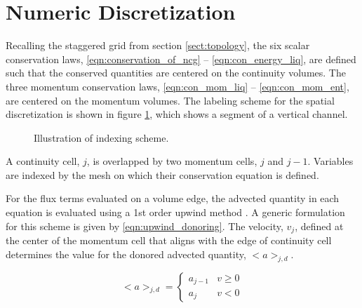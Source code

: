 \section{Numeric Discretization}
\label{sect:numeric_methods}
Recalling the staggered grid from section \ref{sect:topology}, the six scalar conservation laws, \eqref{eqn:conservation_of_ncg} -- \eqref{eqn:con_energy_liq}, are defined such that the conserved quantities are centered on the continuity volumes.
The three momentum conservation laws, \eqref{eqn:con_mom_liq} -- \eqref{eqn:con_mom_ent}, are centered on the momentum volumes.
The labeling scheme for the spatial discretization is shown in figure \ref{fig:vertical_pipe_with_cells}, which shows a segment of a vertical channel.

\begin{figure}[ht]
\caption{Illustration of indexing scheme.}
\label{fig:vertical_pipe_with_cells}
\begin{center}
\end{center}
\end{figure}

A continuity cell, $j$, is overlapped by two momentum cells, $j$ and $j-1$.
Variables are indexed by the mesh on which their conservation equation is defined.

For the flux terms evaluated on a volume edge, the advected quantity in each equation is evaluated using a 1st order upwind method \cite{Tannehill1997}.
A generic formulation for this scheme is given by \ref{eqn:upwind_donoring}.
The velocity, $v_j$, defined at the center of the momentum cell that aligns with the edge of continuity cell determines the value for the donored advected quantity, $<a>_{j,d}$.

\begin{equation}
\label{eqn:upwind_donoring}
<a>_{j, d} = \begin{cases} a_{j-1} &  v \geq 0 \\ a_{j} & v < 0 \end{cases}
\end{equation}

